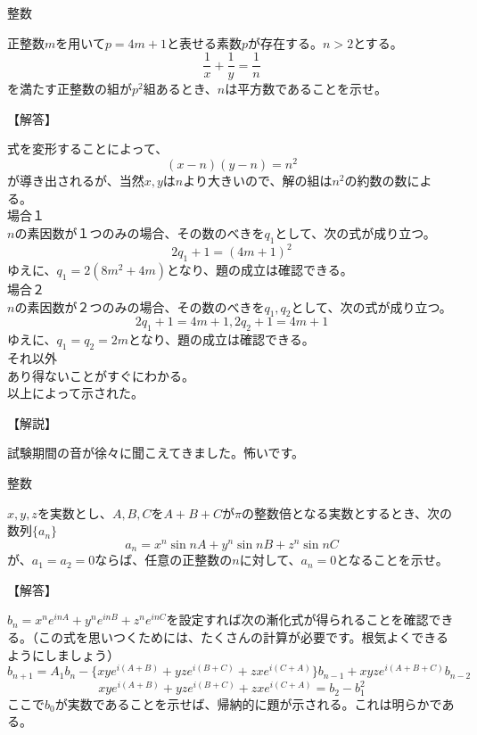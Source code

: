 \documentclass[a4paper,fleqn,dvipdfmx]{jsarticle}
\begin{document}
\newpage


\begin{itembox}[l]{整数}

    正整数$m$を用いて$p=4m+1$と表せる素数$p$が存在する。$n>2$とする。
    $$\frac{1}{x}+\frac{1}{y}=\frac{1}{n}$$
    を満たす正整数の組が$p^2$組あるとき、$n$は平方数であることを示せ。
    
\end{itembox}


\begin{flushleft}
【解答】
\end{flushleft}

    式を変形することによって、
    $$(x-n)(y-n)=n^2$$
    が導き出されるが、当然$x,y$は$n$より大きいので、解の組は$n^2$の約数の数による。\\
    場合１\\
    $n$の素因数が１つのみの場合、その数のべきを$q_1$として、次の式が成り立つ。
    $$2q_1+1=(4m+1)^2$$
    ゆえに、$q_1=2(8m^2+4m)$となり、題の成立は確認できる。\\
    場合２\\
    $n$の素因数が２つのみの場合、その数のべきを$q_1,q_2$として、次の式が成り立つ。
    $$2q_1+1=4m+1,2q_2+1=4m+1$$
    ゆえに、$q_1=q_2=2m$となり、題の成立は確認できる。\\
    それ以外\\
    あり得ないことがすぐにわかる。\\
    以上によって示された。

\begin{flushleft}
【解説】
\end{flushleft}

    試験期間の音が徐々に聞こえてきました。怖いです。



\newpage


\begin{itembox}[l]{整数}

    $x,y,z$を実数とし、$A,B,C$を$A+B+C$が$\pi$の整数倍となる実数とするとき、次の数列$\{a_n\}$
    $$a_n=x^n\sin nA+y^n\sin nB+z^n\sin nC$$
    が、$a_1=a_2=0$ならば、任意の正整数の$n$に対して、$a_n=0$となることを示せ。
    
\end{itembox}


\begin{flushleft}
【解答】
\end{flushleft}

    $b_n=x^ne^{inA}+y^ne^{inB}+z^ne^{inC}$を設定すれば次の漸化式が得られることを確認できる。（この式を思いつくためには、たくさんの計算が必要です。根気よくできるようにしましょう）
    $$b_{n+1}=A_1b_n-\{xye^{i(A+B)}+yze^{i(B+C)}+zxe^{i(C+A)}\}b_{n-1}+xyze^{i(A+B+C)}b_{n-2}$$
    $$xye^{i(A+B)}+yze^{i(B+C)}+zxe^{i(C+A)}=b_2-b_1^2$$
    ここで$b_0$が実数であることを示せば、帰納的に題が示される。これは明らかである。
\end{document}
